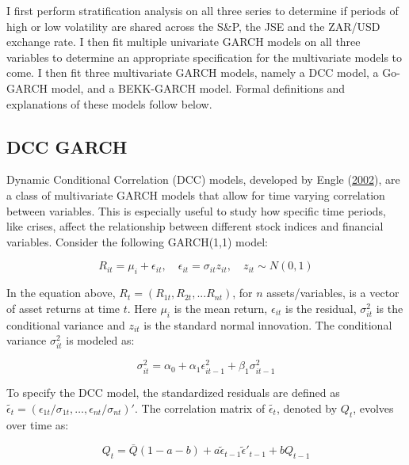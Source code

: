 \documentclass[11pt,preprint, authoryear]{elsarticle}
\numberwithin{equation}{section}
\numberwithin{figure}{section}
\numberwithin{table}{section}
\begin{document}
I first perform stratification analysis on all three series to determine
if periods of high or low volatility are shared across the S\&P, the JSE
and the ZAR/USD exchange rate. I then fit multiple univariate GARCH
models on all three variables to determine an appropriate specification
for the multivariate models to come. I then fit three multivariate GARCH
models, namely a DCC model, a Go-GARCH model, and a BEKK-GARCH model.
Formal definitions and explanations of these models follow below.

\hypertarget{dcc-garch}{%
\subsection{DCC GARCH}\label{dcc-garch}}

Dynamic Conditional Correlation (DCC) models, developed by Engle
(\protect\hyperlink{ref-Engle2002}{2002}), are a class of multivariate
GARCH models that allow for time varying correlation between variables.
This is especially useful to study how specific time periods, like
crises, affect the relationship between different stock indices and
financial variables. Consider the following GARCH(1,1) model:

\begin{equation}
R_{it} = \mu_i + \epsilon_{it}, \quad \epsilon_{it} = \sigma_{it}z_{it}, \quad z_{it} \sim N(0,1) \label{eq1}
\end{equation}

In the equation above, \(R_t = (R_{1t}, R_{2t}, ... R_{nt})\), for \(n\)
assets/variables, is a vector of asset returns at time \(t\). Here
\(\mu_i\) is the mean return, \(\epsilon_{it}\) is the residual,
\(\sigma_{it}^2\) is the conditional variance and \(z_{it}\) is the
standard normal innovation. The conditional variance \(\sigma_{it}^2\)
is modeled as:

\begin{equation}
\sigma_{it}^2 = \alpha_0 + \alpha_1 \epsilon_{it-1}^2 + \beta_1 \sigma_{it-1}^2 \label{eq2}
\end{equation}

To specify the DCC model, the standardized residuals are defined as
\(\tilde{\epsilon_t} = \left( \epsilon_{1t} / \sigma_{1t}, \ldots, \epsilon_{nt} / \sigma_{nt} \right)'\).
The correlation matrix of \(\tilde{\epsilon_t}\), denoted by \(Q_t\),
evolves over time as:

\begin{equation}
Q_t = \bar{Q}(1 - a - b) + a \tilde{\epsilon}_{t-1}  \tilde{\epsilon}'_{t-1} + b Q_{t-1} \label{eq3}
\end{equation}
\end{document}
